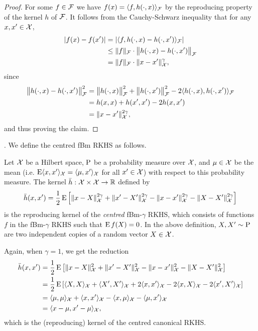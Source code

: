 \documentclass[a4paper,showframe,11pt,draft]{report}
\begin{document}
\begin{proof}
  For some $f \in {\mathcal F}$ we have $f(x) = \langle f,h(\cdot,x)\rangle_{\mathcal F}$ by the reproducing property of the kernel $h$ of ${\mathcal F}$.
  It follows from the Cauchy-Schwarz inequality that for any $x,x'\in{\mathcal X}$,
  \begin{align*}
    \vert f(x) - f(x') \vert 
    &= \vert \langle f,h(\cdot,x) - h(\cdot,x')\rangle_{\mathcal F} \vert \\
    &\leq \lVert f\rVert_{\mathcal F} \cdot \big\Vert h(\cdot,x) - h(\cdot,x') \big\Vert_{\mathcal F} \\
    &= \lVert f\rVert_{\mathcal F} \cdot \lVert x-x'\rVert_{\mathcal X}^{\gamma},
  \end{align*}
  since
  \begin{align*}
    \big\Vert h(\cdot,x) - h(\cdot,x') \big\Vert_{\mathcal F} ^2
    &= \big\Vert h(\cdot,x) \big\Vert_{\mathcal F} ^2 + \big\Vert h(\cdot,x') \big\Vert_{\mathcal F} ^2 - 2 \langle h(\cdot,x),h(\cdot,x')\rangle_{\mathcal F} \\
    &= h(x,x) + h(x',x') - 2 h(x,x') \\
    &= \lVert x-x'\rVert_{\mathcal X}^{2\gamma},
  \end{align*}  
  and thus proving the claim.
\end{proof}

.
We define the centred fBm RKHS as follows.

\begin{definition}
  Let ${\mathcal X}$ be a Hilbert space, $\operatorname{P}$ be a probability measure over ${\mathcal X}$, and $\mu\in{\mathcal X}$ be the mean (i.e. $\operatorname{E}\langle x,x'\rangle_{{\mathcal X}}  = \langle\mu,x'\rangle_{{\mathcal X}}$ for all $x' \in {\mathcal X}$) with respect to this probability measure.
  The kernel $\bar h:{\mathcal X}\times{\mathcal X}\to\mathbb{R}$ defined by
  \[
    \bar h(x,x') = \frac{1}{2} \operatorname{E} \left[ \lVert x-X\rVert_{\mathcal X}^{2\gamma} + \lVert x'-X'\rVert_{\mathcal X}^{2\gamma} - \lVert x-x'\rVert_{\mathcal X}^{2\gamma} - \lVert X-X'\rVert_{\mathcal X}^{2\gamma} \right]
  \]
  is the reproducing kernel of the \emph{centred} fBm-$\gamma$ RKHS, which consists of functions $f$ in the fBm-$\gamma$ RKHS such that $\operatorname{E} f(X) = 0$.
  In the above definition, $X,X' \sim \operatorname{P}$ are two independent copies of a random vector $X \in {\mathcal X}$.
\end{definition}

\begin{remark}
  Again, when $\gamma=1$, we get the reduction 
  \begin{align*}
    \bar h(x,x') 
    &= \frac{1}{2} \operatorname{E} \left[ \lVert x-X\rVert_{\mathcal X}^{2} + \lVert x'-X'\rVert_{\mathcal X}^{2} - \lVert x-x'\rVert_{\mathcal X}^{2} - \lVert X-X'\rVert_{\mathcal X}^{2} \right] \\
    &= \frac{1}{2} \operatorname{E} \left[ \langle X,X\rangle_{\mathcal X} + \langle X',X'\rangle_{\mathcal X} + 2\langle x,x'\rangle_{\mathcal X} - 2\langle x,X\rangle_{\mathcal X} - 2\langle x',X'\rangle_{\mathcal X}\right] \\
    &= \langle\mu,\mu\rangle_{\mathcal X} + \langle x,x'\rangle_{\mathcal X} - \langle x,\mu\rangle_{\mathcal X} - \langle\mu,x'\rangle_{\mathcal X} \\
    &= \langle x-\mu,x'-\mu\rangle_{\mathcal X},
  \end{align*}
  which is the (reproducing) kernel of the centred canonical RKHS.
\end{remark}
\end{document}

